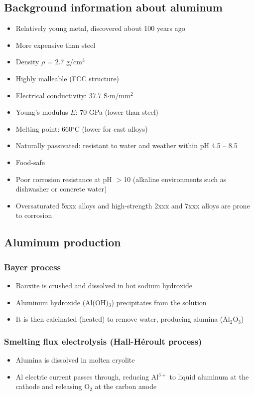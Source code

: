 \documentclass{article}
\begin{document}
\subsection{Background information about aluminum}
\begin{itemize}
  \item Relatively young metal, discovered about 100 years ago
  \item More expensive than steel
  \item Density $\rho$ = 2.7 g/cm$^3$
  \item Highly malleable (FCC structure)
  \item Electrical conductivity: 37.7 S$\cdot$m/mm$^2$
  \item Young's modulus $E$: 70 GPa (lower than steel)
  \item Melting point: 660$^\circ$C (lower for cast alloys)
  \item Naturally passivated: resistant to water and weather within pH 4.5 -- 8.5
  \item Food-safe
  \item Poor corrosion resistance at pH $>$10 (alkaline environments such as dishwasher or concrete water)
  \item Oversaturated 5xxx alloys and high-strength 2xxx and 7xxx alloys are prone to corrosion
\end{itemize}

\subsection{Aluminum production}
\subsubsection{Bayer process}
\begin{itemize}
  \item Bauxite is crushed and dissolved in hot sodium hydroxide
  \item Aluminum hydroxide (Al(OH)$_3$) precipitates from the solution
  \item It is then calcinated (heated) to remove water, producing alumina (Al$_2$O$_3$)
\end{itemize}

\subsubsection{Smelting flux electrolysis (Hall-Héroult process)}
\begin{itemize}
  \item Alumina is dissolved in molten cryolite
  \item Al electric current passes through, reducing Al$^{3+}$ to liquid aluminum at the cathode and releasing O$_2$ at the carbon anode
\end{itemize}
\end{document}
